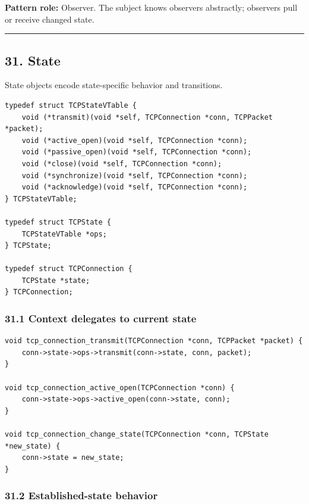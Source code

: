 \documentclass[11pt]{article}
\begin{document}
\textbf{Pattern role:} Observer. The subject knows observers abstractly; observers pull or receive changed state.

\begin{center}\rule{0.5\linewidth}{0.5pt}\end{center}

\subsection{31. State}\label{state}

State objects encode state-specific behavior and transitions.

\begin{verbatim}
typedef struct TCPStateVTable {
    void (*transmit)(void *self, TCPConnection *conn, TCPPacket *packet);
    void (*active_open)(void *self, TCPConnection *conn);
    void (*passive_open)(void *self, TCPConnection *conn);
    void (*close)(void *self, TCPConnection *conn);
    void (*synchronize)(void *self, TCPConnection *conn);
    void (*acknowledge)(void *self, TCPConnection *conn);
} TCPStateVTable;

typedef struct TCPState {
    TCPStateVTable *ops;
} TCPState;

typedef struct TCPConnection {
    TCPState *state;
} TCPConnection;
\end{verbatim}

\subsubsection{31.1 Context delegates to current state}\label{context-delegates-to-current-state}

\begin{verbatim}
void tcp_connection_transmit(TCPConnection *conn, TCPPacket *packet) {
    conn->state->ops->transmit(conn->state, conn, packet);
}

void tcp_connection_active_open(TCPConnection *conn) {
    conn->state->ops->active_open(conn->state, conn);
}

void tcp_connection_change_state(TCPConnection *conn, TCPState *new_state) {
    conn->state = new_state;
}
\end{verbatim}

\subsubsection{31.2 Established-state behavior}\label{established-state-behavior}
\end{document}
